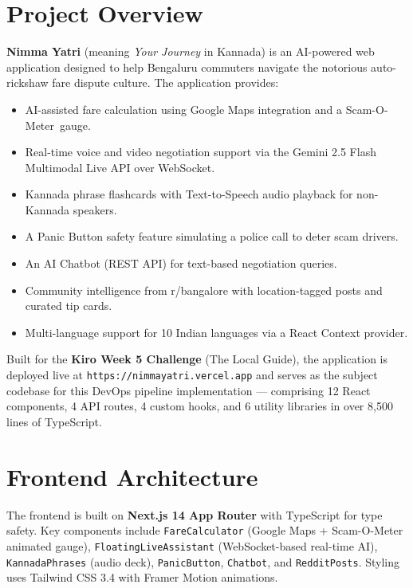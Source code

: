 \documentclass[12pt,a4paper,oneside]{report}
\begin{document}
\section{Project Overview}

\textbf{Nimma Yatri} (meaning \emph{Your Journey} in Kannada) is an AI-powered web
application designed to help Bengaluru commuters navigate the notorious auto-rickshaw
fare dispute culture. The application provides:

\begin{itemize}
  \item AI-assisted fare calculation using Google Maps integration and a
        Scam-O-Meter\texttrademark\ gauge.
  \item Real-time voice and video negotiation support via the Gemini 2.5 Flash
        Multimodal Live API over WebSocket.
  \item Kannada phrase flashcards with Text-to-Speech audio playback for
        non-Kannada speakers.
  \item A Panic Button safety feature simulating a police call to deter scam drivers.
  \item An AI Chatbot (REST API) for text-based negotiation queries.
  \item Community intelligence from r/bangalore with location-tagged posts and
        curated tip cards.
  \item Multi-language support for 10 Indian languages via a React Context provider.
\end{itemize}

Built for the \textbf{Kiro Week 5 Challenge} (The Local Guide), the application is
deployed live at \texttt{https://nimmayatri.vercel.app} and serves as the subject
codebase for this DevOps pipeline implementation --- comprising 12 React components,
4 API routes, 4 custom hooks, and 6 utility libraries in over 8,500 lines of
TypeScript.

\section{Frontend Architecture}

The frontend is built on \textbf{Next.js 14 App Router} with TypeScript for type
safety. Key components include \texttt{FareCalculator} (Google Maps + Scam-O-Meter
animated gauge), \texttt{FloatingLiveAssistant} (WebSocket-based real-time AI),
\texttt{KannadaPhrases} (audio deck), \texttt{PanicButton}, \texttt{Chatbot}, and
\texttt{RedditPosts}. Styling uses Tailwind CSS 3.4 with Framer Motion animations.
\end{document}
